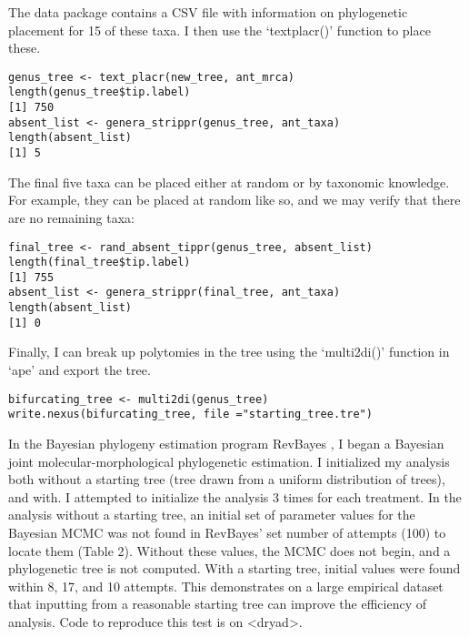 \documentclass[11pt]{article}
\begin{document}
The data package contains a CSV file with information on phylogenetic placement for 15 of these taxa. I then use the `textplacr()' function to place these.

{\tt \begin{snugshade*}
\begin{lstlisting}
genus_tree <- text_placr(new_tree, ant_mrca)
length(genus_tree$tip.label)
[1] 750
absent_list <- genera_strippr(genus_tree, ant_taxa)
length(absent_list)
[1] 5
\end{lstlisting}
\end{snugshade*}}

The final five taxa can be placed either at random or by taxonomic knowledge. 
For example, they can be placed at random like so, and we may verify that there are no remaining taxa:
{\tt \begin{snugshade*}
\begin{lstlisting}
final_tree <- rand_absent_tippr(genus_tree, absent_list)
length(final_tree$tip.label)
[1] 755
absent_list <- genera_strippr(final_tree, ant_taxa)
length(absent_list)
[1] 0
\end{lstlisting}
\end{snugshade*}}

\par

Finally, I can break up polytomies in the tree using the `multi2di()' function in `ape' and export the tree.

{\tt \begin{snugshade*}
\begin{lstlisting}
bifurcating_tree <- multi2di(genus_tree)
write.nexus(bifurcating_tree, file ="starting_tree.tre")
\end{lstlisting}
\end{snugshade*}}

In the Bayesian phylogeny estimation program RevBayes \citep{Hoehna2014b, Hoehna2016b}, I began a Bayesian joint molecular-morphological phylogenetic estimation. 
I initialized my analysis both without a starting tree (tree drawn from a uniform distribution of trees), and with.
I attempted to initialize the analysis 3 times for each treatment.
In the analysis without a starting tree, an initial set of parameter values for the Bayesian MCMC was not found in RevBayes' set number of attempts (100) to locate them (Table 2).
Without these values, the MCMC does not begin, and a phylogenetic tree is not computed. 
With a starting tree, initial values were found within 8, 17, and 10 attempts. 
This demonstrates on a large empirical dataset that inputting from a reasonable starting tree can improve the efficiency of analysis. 
Code to reproduce this test is on <dryad>. \par
\end{document}
